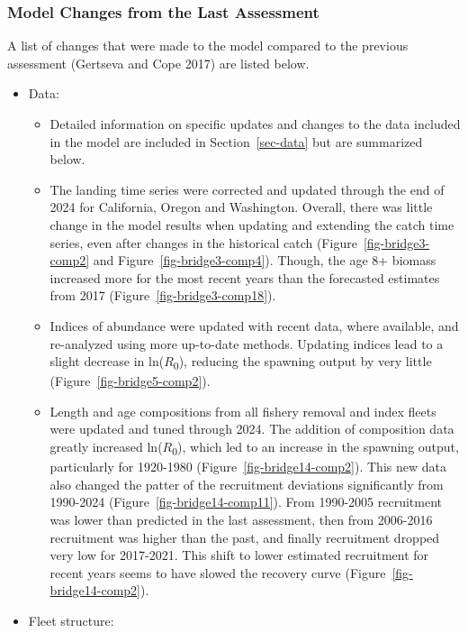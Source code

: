 \documentclass[
]{scrartcl}
\providecommand{\tightlist}{%
  \setlength{\itemsep}{0pt}\setlength{\parskip}{0pt}}\usepackage{longtable,booktabs,array}
\begin{document}
\subsubsection{Model Changes from the Last
Assessment}\label{sec-changes}

A list of changes that were made to the model compared to the previous
assessment (Gertseva and Cope 2017) are listed below.

\begin{itemize}
\tightlist
\item
  Data:

  \begin{itemize}
  \tightlist
  \item
    Detailed information on specific updates and changes to the data
    included in the model are included in Section~\ref{sec-data} but are
    summarized below.
  \item
    The landing time series were corrected and updated through the end
    of 2024 for California, Oregon and Washington. Overall, there was
    little change in the model results when updating and extending the
    catch time series, even after changes in the historical catch
    (Figure~\ref{fig-bridge3-comp2} and Figure~\ref{fig-bridge3-comp4}).
    Though, the age 8+ biomass increased more for the most recent years
    than the forecasted estimates from 2017
    (Figure~\ref{fig-bridge3-comp18}).\\
  \item
    Indices of abundance were updated with recent data, where available,
    and re-analyzed using more up-to-date methods. Updating indices lead
    to a slight decrease in ln(\(R\)\textsubscript{0}), reducing the
    spawning output by very little (Figure~\ref{fig-bridge5-comp2}).
  \item
    Length and age compositions from all fishery removal and index
    fleets were updated and tuned through 2024. The addition of
    composition data greatly increased ln(\(R\)\textsubscript{0}), which
    led to an increase in the spawning output, particularly for
    1920-1980 (Figure~\ref{fig-bridge14-comp2}). This new data also
    changed the patter of the recruitment deviations significantly from
    1990-2024 (Figure~\ref{fig-bridge14-comp11}). From 1990-2005
    recruitment was lower than predicted in the last assessment, then
    from 2006-2016 recruitment was higher than the past, and finally
    recruitment dropped very low for 2017-2021. This shift to lower
    estimated recruitment for recent years seems to have slowed the
    recovery curve (Figure~\ref{fig-bridge14-comp2}).
  \end{itemize}
\item
  Fleet structure:


\end{itemize}
\end{document}
